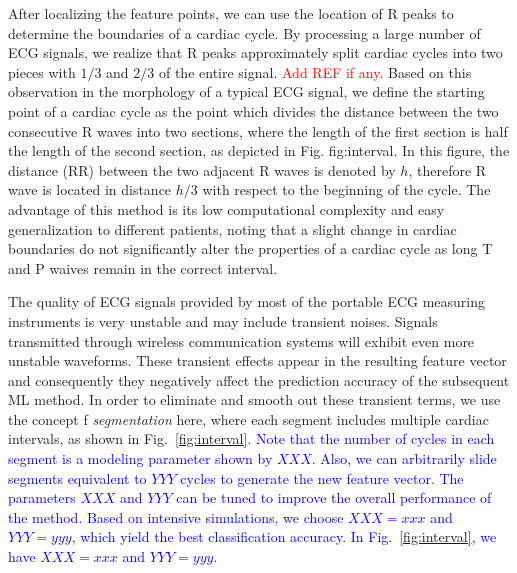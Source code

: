 After localizing the feature points, we can use the location of R peaks to determine the boundaries of a cardiac cycle. %
By processing a large number of ECG signals, we realize that R peaks approximately split cardiac cycles into two pieces with $1/3$ and $2/3$ of the entire signal. \textcolor{red}{Add REF if any}. 
Based on this observation in the morphology of a typical ECG signal, we define the starting point of a cardiac cycle as the point which divides the distance between the two consecutive R waves into two sections, where the length of the first section is half the length of the second section, as depicted in Fig. {fig:interval}. In this figure, the distance (RR) between the two adjacent R waves is denoted by $h$, therefore R wave is located in distance $h/3$ with respect to the beginning of the cycle. The advantage of this method is its low computational complexity and easy generalization to different patients, noting that a slight change in cardiac boundaries do not significantly alter the properties of a cardiac cycle as long T and P waives remain in the correct interval. 

The quality of ECG signals provided by most of the portable ECG measuring instruments is very unstable and may include transient noises. Signals transmitted through wireless communication systems will exhibit even more unstable waveforms. These transient effects appear in the resulting feature vector and consequently they negatively affect the prediction accuracy of the subsequent ML method. In order to eliminate and smooth out these transient terms, we use the concept f \textit{segmentation} here, where each segment includes multiple cardiac intervals, 
as shown in Fig.~\ref{fig:interval}. \textcolor{blue}{Note that the number of cycles in each segment is a modeling parameter shown by $XXX$. Also, we can arbitrarily slide segments equivalent to $YYY$ cycles to generate the new feature vector. The parameters $XXX$ and $YYY$ can be tuned to improve the overall performance of the method.  Based on intensive simulations, we choose $XXX=xxx$ and $YYY=yyy$, which yield the best classification accuracy. In Fig.~\ref{fig:interval}, we have $XXX=xxx$ and $YYY=yyy$.}

